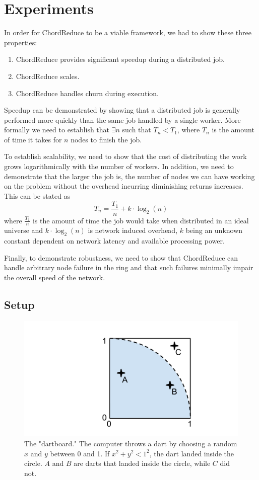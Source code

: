 \documentclass[10pt, conference, compsocconf]{IEEEtran}
\begin{document}
\section{Experiments}
In order for ChordReduce to be a viable framework, we had to show these three properties:
\begin{enumerate}
    \item ChordReduce provides significant speedup during a distributed job.
    \item ChordReduce scales.
    \item ChordReduce handles churn during execution.
\end{enumerate}
Speedup can be demonstrated by showing that a distributed job is generally performed more quickly than the same job handled by a single worker.  More formally we need to establish that $\exists n$ such that $T_{n} < T_{1}$, where $T_{n}$ is the amount of time it takes for $n$ nodes to finish the job.

To establish scalability, we need to show that the cost of distributing the work grows logarithmically with the number of workers.  In addition, we need to demonstrate that the larger the job is, the number of nodes we can have working on the problem without the overhead incurring diminishing returns increases. This can be stated as $$T_{n} = \frac{T_{1}}{n} + k \cdot \log_{2}(n)$$ where $\frac{T_{1}}{n}$ is the amount of time the job would take when distributed in an ideal universe and $k \cdot \log_{2}(n)$ is network induced overhead, $k$ being an unknown constant dependent on network latency and available processing power.

Finally, to demonstrate robustness, we need to show that ChordReduce can handle arbitrary node failure in the ring and that such failures minimally impair the overall speed of the network.

\subsection{Setup}

\begin{figure}
    \includegraphics[width=\linewidth]{dartboard}
    \caption{The "dartboard." The computer throws a dart by choosing a random $x$ and $y$ between 0 and 1.  If $x^{2} + y^{2} < 1^{2} $, the dart landed inside the circle.  $A$ and $B$ are darts that landed inside the circle, while $C$ did not.}
    \label{dartboard}
\end{figure}
\end{document}
